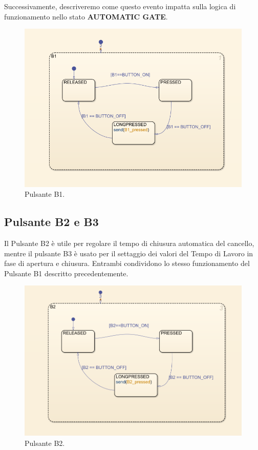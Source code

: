 \documentclass[12pt]{article}
\begin{document}
Successivamente, descriveremo come questo evento impatta sulla logica di funzionamento nello stato \textbf{AUTOMATIC GATE}.

\begin{figure}[H]
    \centering
    \includegraphics[width=1\textwidth]{Immagini_State_Flow/Pulsante_B1.png}
    \caption{Pulsante B1.}
\end{figure}

\subsection{Pulsante B2 e B3}

Il Pulsante B2 è utile per regolare il tempo di chiusura automatica del cancello, mentre il pulsante B3 è usato per il settaggio dei valori del Tempo di Lavoro in fase di apertura e chiusura. Entrambi condividono lo stesso funzionamento del Pulsante B1 descritto precedentemente.

\begin{figure}[H]
    \centering
    \includegraphics[width=1\textwidth]{Immagini_State_Flow/Pulsante_B2.png}
    \caption{Pulsante B2.}
\end{figure}
\end{document}
